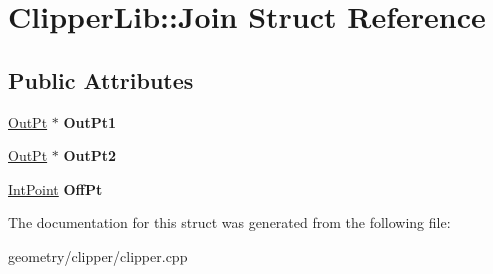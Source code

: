 \hypertarget{struct_clipper_lib_1_1_join}{}\section{Clipper\+Lib\+:\+:Join Struct Reference}
\label{struct_clipper_lib_1_1_join}
\subsection*{Public Attributes}
\begin{DoxyCompactItemize}
\item 
\mbox{\label{struct_clipper_lib_1_1_join_a83d7ff096b1cf9425f1c814b7ee5a55d}} 
\mbox{\hyperlink{struct_clipper_lib_1_1_out_pt}{Out\+Pt}} $\ast$ {\bfseries Out\+Pt1}
\item 
\mbox{\label{struct_clipper_lib_1_1_join_a589b2e1162679def2ccd3889306a9230}} 
\mbox{\hyperlink{struct_clipper_lib_1_1_out_pt}{Out\+Pt}} $\ast$ {\bfseries Out\+Pt2}
\item 
\mbox{\label{struct_clipper_lib_1_1_join_afa70561700d774cd762d125f9866327f}} 
\mbox{\hyperlink{struct_clipper_lib_1_1_int_point}{Int\+Point}} {\bfseries Off\+Pt}
\end{DoxyCompactItemize}


The documentation for this struct was generated from the following file\+:\begin{DoxyCompactItemize}
\item 
geometry/clipper/clipper.\+cpp\end{DoxyCompactItemize}
